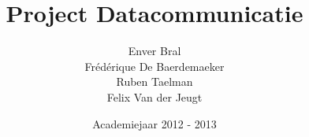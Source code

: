 \documentclass[]{article}
\begin{document}
\title{Project Datacommunicatie}
\author{Enver Bral \\ Fr\'ed\'erique De Baerdemaeker \\ Ruben Taelman \\ Felix Van der Jeugt}
\date{Academiejaar 2012 - 2013}
\maketitle
\end{document}
